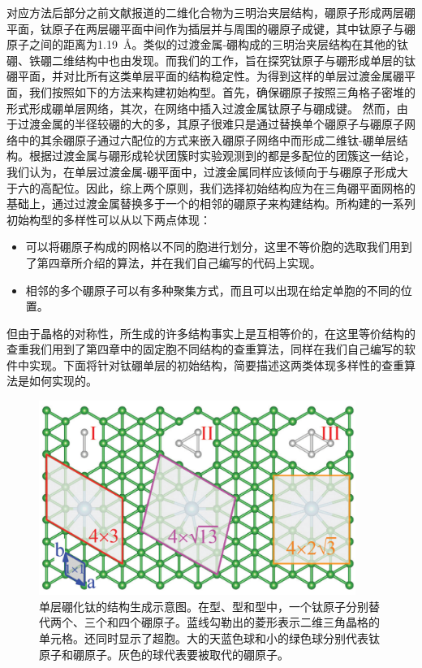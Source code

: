 对应方法后部分之前文献报道的二维化合物为三明治夹层结构，硼原子形成两层硼平面，钛原子在两层硼平面中间作为插层并与周围的硼原子成键，其中钛原子与硼原子之间的距离为\SI{1.19}{\angstrom}。类似的过渡金属-硼构成的三明治夹层结构在其他的钛硼、铁硼二维结构中也由发现。而我们的工作，旨在探究钛原子与硼形成单层的钛硼平面，并对比所有这类单层平面的结构稳定性。为得到这样的单层过渡金属硼平面，我们按照如下的方法来构建初始构型。首先，确保硼原子按照三角格子密堆的形式形成硼单层网络，其次，在网络中插入过渡金属钛原子与硼成键。
然而，由于过渡金属的半径较硼的大的多，其原子很难只是通过替换单个硼原子与硼原子网络中的其余硼原子通过六配位的方式来嵌入硼原子网络中而形成二维钛-硼单层结构。根据过渡金属与硼形成轮状团簇时实验观测到的都是多配位的团簇这一结论，我们认为，在单层过渡金属-硼平面中，过渡金属同样应该倾向于与硼原子形成大于六的高配位。因此，综上两个原则，我们选择初始结构应为在三角硼平面网格的基础上，通过过渡金属替换多于一个的相邻的硼原子来构建结构。所构建的一系列初始构型的多样性可以从以下两点体现：
\begin{itemize}
  \item 可以将硼原子构成的网格以不同的胞进行划分，这里不等价胞的选取我们用到了第四章所介绍的算法，并在我们自己编写的代码上实现。
  \item 相邻的多个硼原子可以有多种聚集方式，而且可以出现在给定单胞的不同的位置。
\end{itemize}
但由于晶格的对称性，所生成的许多结构事实上是互相等价的，在这里等价结构的查重我们用到了第四章中的固定胞不同结构的查重算法，同样在我们自己编写的软件中实现。下面将针对钛硼单层的初始结构，简要描述这两类体现多样性的查重算法是如何实现的。

\begin{figure}
  \includegraphics[width=0.92\textwidth]{figs/ch5_how_cell_choose.png}
  \centering
  \caption{单层硼化钛的结构生成示意图。在型、型和型中，一个钛原子分别替代两个、三个和四个硼原子。蓝线勾勒出的菱形表示二维三角晶格的单元格。还同时显示了超胞。大的天蓝色球和小的绿色球分别代表钛原子和硼原子。灰色的球代表要被取代的硼原子。}
  \label{fig:ch5_how_cell_choose}
\end{figure}


